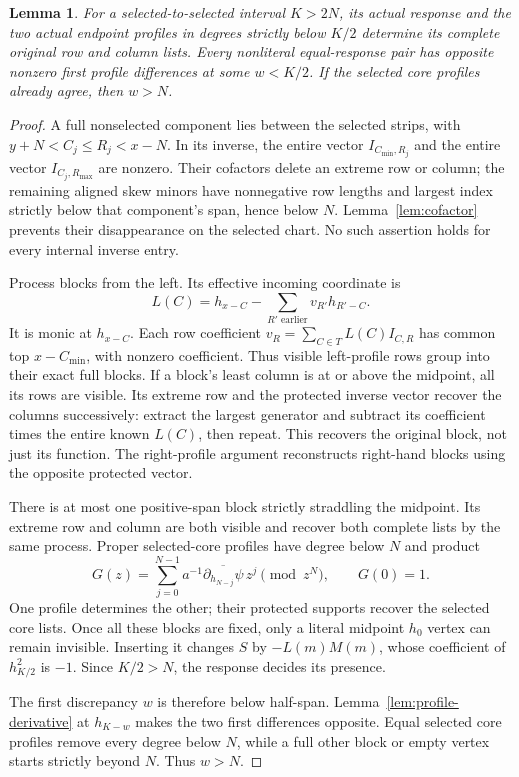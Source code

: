 \documentclass[11pt,a4paper]{amsart}
\numberwithin{equation}{section}
\theoremstyle{plain}
\newtheorem{lemma}[theorem]{Lemma}
\theoremstyle{definition}
\begin{document}
\begin{lemma}\label{lem:early-recovery}
For a selected-to-selected interval \(K>2N\), its actual response and the two actual endpoint profiles in degrees strictly below \(K/2\) determine its complete original row and column lists.  Every nonliteral equal-response pair has opposite nonzero first profile differences at some \(w<K/2\).  If the selected core profiles already agree, then \(w>N\).
\end{lemma}
\begin{proof}
A full nonselected component lies between the selected strips, with \(y+N<C_j\le R_j<x-N\).  In its inverse, the entire vector \(I_{C_{\min},R_j}\) and the entire vector \(I_{C_j,R_{\max}}\) are nonzero.  Their cofactors delete an extreme row or column; the remaining aligned skew minors have nonnegative row lengths and largest index strictly below that component's span, hence below \(N\).  Lemma~\ref{lem:cofactor} prevents their disappearance on the selected chart.  No such assertion holds for every internal inverse entry.

Process blocks from the left.  Its effective incoming coordinate is
\[
 L(C)=h_{x-C}-\sum_{R'\text{ earlier}}v_{R'}h_{R'-C}.
\]
It is monic at \(h_{x-C}\).  Each row coefficient \(v_R=\sum_{C\in T}L(C)I_{C,R}\) has common top \(x-C_{\min}\), with nonzero coefficient.  Thus visible left-profile rows group into their exact full blocks.  If a block's least column is at or above the midpoint, all its rows are visible.  Its extreme row and the protected inverse vector recover the columns successively: extract the largest generator and subtract its coefficient times the entire known \(L(C)\), then repeat.  This recovers the original block, not just its function.  The right-profile argument reconstructs right-hand blocks using the opposite protected vector.

There is at most one positive-span block strictly straddling the midpoint.  Its extreme row and column are both visible and recover both complete lists by the same process.  Proper selected-core profiles have degree below \(N\) and product
\[
 G(z)=\sum_{j=0}^{N-1}a^{-1}\overline{\partial_{h_{N-j}}\psi}\,z^j
 \pmod {z^N},\qquad G(0)=1.
\]
One profile determines the other; their protected supports recover the selected core lists.  Once all these blocks are fixed, only a literal midpoint \(h_0\) vertex can remain invisible.  Inserting it changes \(S\) by \(-L(m)M(m)\), whose coefficient of \(h_{K/2}^2\) is \(-1\).  Since \(K/2>N\), the response decides its presence.

The first discrepancy \(w\) is therefore below half-span.  Lemma~\ref{lem:profile-derivative} at \(h_{K-w}\) makes the two first differences opposite.  Equal selected core profiles remove every degree below \(N\), while a full other block or empty vertex starts strictly beyond \(N\).  Thus \(w>N\).
\end{proof}
\end{document}
